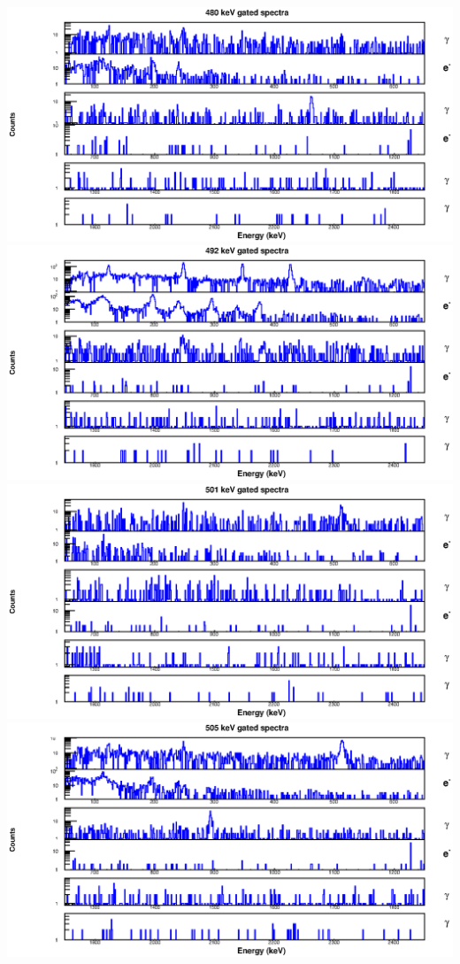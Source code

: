 \begin{landscape}
\includegraphics[scale=1.2]{154Gd_Appendix/480_combined.eps}
\includegraphics[scale=1.2]{154Gd_Appendix/492_combined.eps}
\includegraphics[scale=1.2]{154Gd_Appendix/501_combined.eps}
\includegraphics[scale=1.2]{154Gd_Appendix/505_combined.eps}

\end{landscape}

